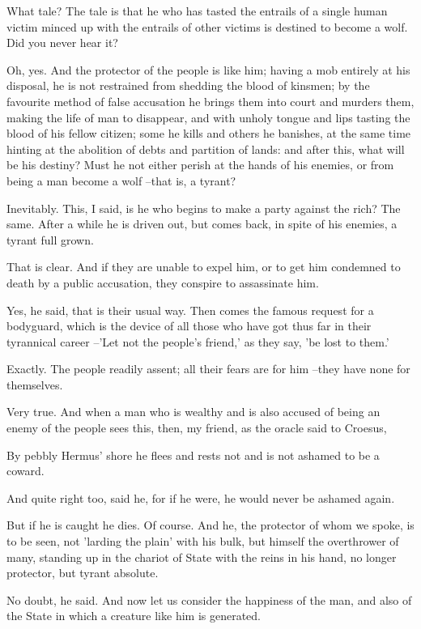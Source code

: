 What tale?
The tale is that he who has tasted the entrails of a single human victim minced up with the entrails of other victims is destined to become a wolf. Did you never hear it?

Oh, yes.
And the protector of the people is like him; having a mob entirely at his disposal, he is not restrained from shedding the blood of kinsmen; by the favourite method of false accusation he brings them into court and murders them, making the life of man to disappear, and with unholy tongue and lips tasting the blood of his fellow citizen; some he kills and others he banishes, at the same time hinting at the abolition of debts and partition of lands: and after this, what will be his destiny? Must he not either perish at the hands of his enemies, or from being a man become a wolf --that is, a tyrant?

Inevitably.
This, I said, is he who begins to make a party against the rich?
The same.
After a while he is driven out, but comes back, in spite of his enemies, a tyrant full grown.

That is clear.
And if they are unable to expel him, or to get him condemned to death by a public accusation, they conspire to assassinate him.

Yes, he said, that is their usual way.
Then comes the famous request for a bodyguard, which is the device of all those who have got thus far in their tyrannical career --'Let not the people's friend,' as they say, 'be lost to them.'

Exactly.
The people readily assent; all their fears are for him --they have none for themselves.

Very true.
And when a man who is wealthy and is also accused of being an enemy of the people sees this, then, my friend, as the oracle said to Croesus,

By pebbly Hermus' shore he flees and rests not and is not ashamed to be a coward.

And quite right too, said he, for if he were, he would never be ashamed again.

But if he is caught he dies.
Of course.
And he, the protector of whom we spoke, is to be seen, not 'larding the plain' with his bulk, but himself the overthrower of many, standing up in the chariot of State with the reins in his hand, no longer protector, but tyrant absolute.

No doubt, he said.
And now let us consider the happiness of the man, and also of the State in which a creature like him is generated.


